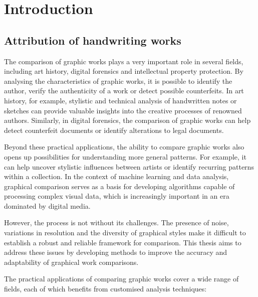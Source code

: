 \chapter{Introduction}
\begin{toReview}
	\section{Attribution of handwriting works}
		\noindent The comparison of graphic works plays a very important role in several fields, including art history, digital forensics and intellectual property protection. By analysing the characteristics of graphic works, it is possible to identify the author, verify the authenticity of a work or detect possible counterfeits. In art history, for example, stylistic and technical analysis of handwritten notes or sketches can provide valuable insights into the creative processes of renowned authors. Similarly, in digital forensics, the comparison of graphic works can help detect counterfeit documents or identify alterations to legal documents.

		\noindent Beyond these practical applications, the ability to compare graphic works also opens up possibilities for understanding more general patterns. For example, it can help uncover stylistic influences between artists or identify recurring patterns within a collection. In the context of machine learning and data analysis, graphical comparison serves as a basis for developing algorithms capable of processing complex visual data, which is increasingly important in an era dominated by digital media.

		\noindent However, the process is not without its challenges. The presence of noise, variations in resolution and the diversity of graphical styles make it difficult to establish a robust and reliable framework for comparison. This thesis aims to address these issues by developing methods to improve the accuracy and adaptability of graphical work comparisons.

		\bigskip
		\noindent The practical applications of comparing graphic works cover a wide range of fields, each of which benefits from customised analysis techniques:


\end{toReview}
